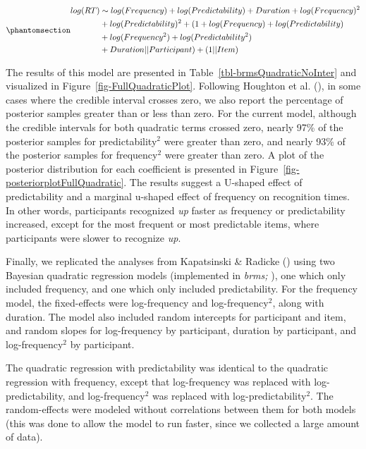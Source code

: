 \documentclass[
  12pt,
  letterpaper,
]{scrreport}
\begin{document}
\begin{equation}\phantomsection\label{eq-BayesianFullModelSyntax}{
\begin{aligned}
log(RT) & \sim  log(Frequency) + log(Predictability) + Duration + log(Frequency)^2  \\ & + log(Predictability)^2 + (1 + log(Frequency) + log(Predictability) \\ & + log(Frequency^2) + log(Predictability^2) \\ & + Duration || Participant) + (1 || Item)
\end{aligned}
}\end{equation}

The results of this model are presented in
Table~\ref{tbl-brmsQuadraticNoInter} and visualized in
Figure~\ref{fig-FullQuadraticPlot}. Following Houghton et al.
(),
in some cases where the credible interval crosses zero, we also report
the percentage of posterior samples greater than or less than zero. For
the current model, although the credible intervals for both quadratic
terms crossed zero, nearly 97\% of the posterior samples for
predictability\(^2\) were greater than zero, and nearly 93\% of the
posterior samples for frequency\(^2\) were greater than zero. A plot of
the posterior distribution for each coefficient is presented in
Figure~\ref{fig-posteriorplotFullQuadratic}. The results suggest a
U-shaped effect of predictability and a marginal u-shaped effect of
frequency on recognition times. In other words, participants recognized
\emph{up} faster as frequency or predictability increased, except for
the most frequent or most predictable items, where participants were
slower to recognize \emph{up}.

Finally, we replicated the analyses from Kapatsinski \& Radicke
() using
two Bayesian quadratic regression models (implemented in \emph{brms;}
), one which
only included frequency, and one which only included predictability. For
the frequency model, the fixed-effects were log-frequency and
log-frequency\(^2\), along with duration. The model also included random
intercepts for participant and item, and random slopes for log-frequency
by participant, duration by participant, and log-frequency\(^2\) by
participant.

The quadratic regression with predictability was identical to the
quadratic regression with frequency, except that log-frequency was
replaced with log-predictability, and log-frequency\(^2\) was replaced
with log-predictability\(^2\). The random-effects were modeled without
correlations between them for both models (this was done to allow the
model to run faster, since we collected a large amount of data).
\end{document}

